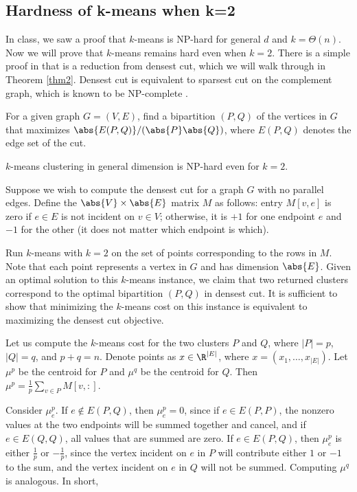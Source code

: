 \subsection{Hardness of k-means when k=2}
In class, we saw a proof that $k$-means is NP-hard for general $d$ and $k=\Theta(n)$. Now we will prove that $k$-means remains hard even when $k=2$. There is a simple proof in \cite{deshpande} that is a reduction from densest cut, which we will walk through in Theorem \ref{thm2}. Densest cut is equivalent to sparsest cut on the complement graph, which is known to be NP-complete \cite{matula1990sparsest}.

\begin{definition}
    For a given graph $G=(V,E)$, find a bipartition $(P,Q)$ of the vertices in $G$ that maximizes $\abs{E(P,Q)}/(\abs{P}\abs{Q})$, where $E(P,Q)$ denotes the edge set of the cut.
\end{definition}

\begin{theorem}\label{thm2}
    $k$-means clustering in general dimension is NP-hard even for $k=2$.
\end{theorem}

Suppose we wish to compute the densest cut for a graph $G$ with no parallel edges. Define the $\abs{V}\times\abs{E}$ matrix $M$ as follows: entry $M[v,e]$ is zero if $e\in E$ is not incident on $v\in V$; otherwise, it is $+1$ for one endpoint $e$ and $-1$ for the other (it does not matter which endpoint is which).

Run $k$-means with $k=2$ on the set of points corresponding to the rows in $M$. Note that each point represents a vertex in $G$ and has dimension $\abs{E}$. Given an optimal solution to this $k$-means instance, we claim that two returned clusters correspond to the optimal bipartition $(P,Q)$ in densest cut. It is sufficient to show that minimizing the $k$-means cost on this instance is equivalent to maximizing the densest cut objective.

Let us compute the $k$-means cost for the two clusters $P$ and $Q$, where $|P|=p$, $|Q|=q$, and $p+q=n$. Denote points as $x\in \R^{|E|}$, where $x=(x_1,\dots,x_{|E|})$. Let $\mu^p$ be the centroid for $P$ and $\mu^q$ be the centroid for $Q$. Then $\mu^p=\frac{1}{p}\sum_{v\in P}M[v,:]$.

Consider $\mu^p_e$. If $e\not\in E(P,Q)$, then $\mu^p_e=0$, since if $e\in E(P,P)$, the nonzero values at the two endpoints will be summed together and cancel, and if $e\in E(Q,Q)$, all values that are summed are zero. If $e\in E(P,Q)$, then $\mu^p_e$ is either $\frac{1}{p}$ or $-\frac{1}{p}$, since the vertex incident on $e$ in $P$ will contribute either $1$ or $-1$ to the sum, and the vertex incident on $e$ in $Q$ will not be summed. Computing $\mu^q$ is analogous. In short,

